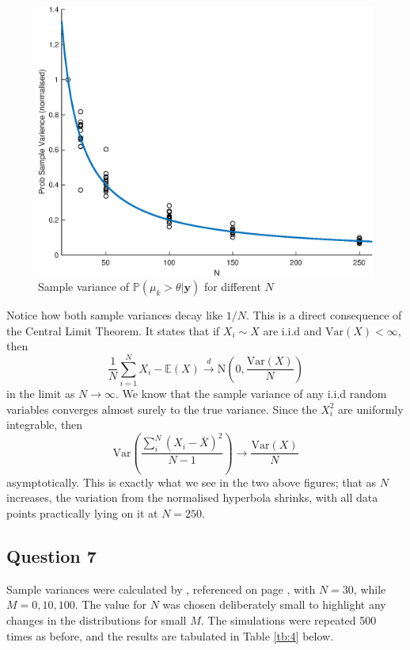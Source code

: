 \documentclass[10pt,a4paper,notitlepage]{article}
\newcommand{\p}{\mathbb{P}}
\newcommand{\E}{\mathbb{E}}
\newcommand{\Var}{\text{Var}}
\newcommand{\y}{\mathbf{y}}
\begin{document}
\begin{figure}[H]
\centering
\includegraphics[width=12cm]{Image_3}
\caption{Sample variance of $\p(\mu_{k}>\theta|\y)$ for different $N$}\label{fg:3}
\end{figure}
Notice how both sample variances decay like $1/N$. This is a direct consequence of the Central Limit Theorem. It states that if $X_{i}\sim X$ are i.i.d and $\Var(X)<\infty$, then
\begin{equation}
\frac{1}{N}\sum_{i=1}^{N}X_{i}-\E(X)\xrightarrow{d}\text{N}\left(0,\frac{\Var(X)}{N}\right)
\end{equation}
in the limit as $N\rightarrow \infty$. We know that the sample variance of any i.i.d random variables converges almost surely to the true variance. Since the $X_{i}^{2}$ are uniformly integrable, then
\begin{equation}
\Var\left(\frac{\sum_{i}^{N}\left(X_{i}-\bar{X}\right)^{2}}{N-1}\right)\rightarrow\frac{\Var(X)}{N}
\end{equation}
asymptotically. This is exactly what we see in the two above figures; that as $N$ increases, the variation from the normalised hyperbola shrinks, with all data points practically lying on it at $N=250$.

\subsection*{\centering Question 7}
Sample variances were calculated by , referenced on page \pageref{cd:6}, with $N=30$, while $M=0,10,100$.  The value for $N$ was chosen deliberately small to highlight any changes in the distributions for small $M$. The simulations were repeated 500 times as before, and the results are tabulated in Table \ref{tb:4} below.
\end{document}
